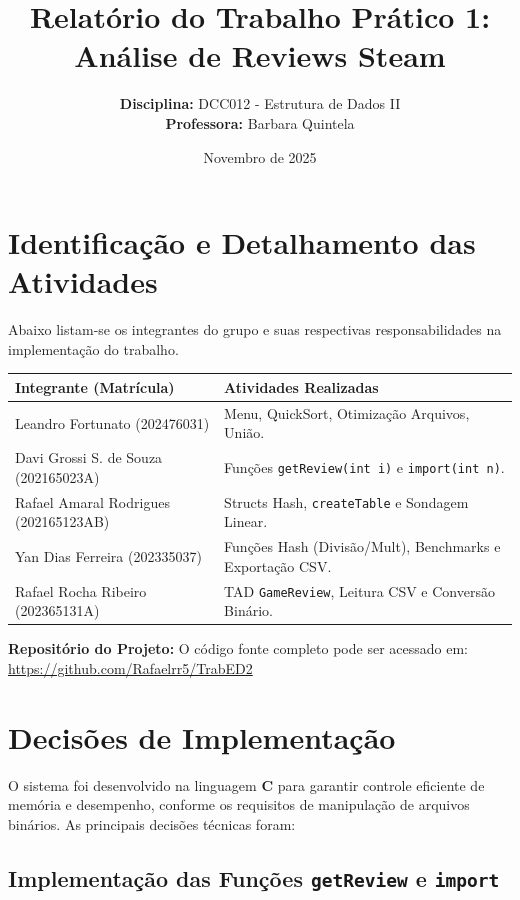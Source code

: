 \documentclass[11pt, a4paper]{article}
\title{\vspace{-2cm} \textbf{Relatório do Trabalho Prático 1: Análise de Reviews Steam}}
\author{
    \textbf{Disciplina:} DCC012 - Estrutura de Dados II \\
    \textbf{Professora:} Barbara Quintela
}
\date{Novembro de 2025}
\begin{document}
\maketitle
\thispagestyle{empty} %

\section{Identificação e Detalhamento das Atividades}

Abaixo listam-se os integrantes do grupo e suas respectivas responsabilidades na implementação do trabalho.

\begin{table}[h]
    \centering
    \begin{tabular}{@{}ll@{}}
        \toprule
        \textbf{Integrante (Matrícula)} & \textbf{Atividades Realizadas} \\ \midrule
        Leandro Fortunato (202476031) & Menu, QuickSort, Otimização Arquivos, União. \\ \midrule
        Davi Grossi S. de Souza (202165023A) & Funções \texttt{getReview(int i)} e \texttt{import(int n)}. \\ \midrule
        Rafael Amaral Rodrigues (202165123AB) & Structs Hash, \texttt{createTable} e Sondagem Linear. \\ \midrule
        Yan Dias Ferreira (202335037) & Funções Hash (Divisão/Mult), Benchmarks e Exportação CSV. \\ \midrule
        Rafael Rocha Ribeiro (202365131A) & TAD \texttt{GameReview}, Leitura CSV e Conversão Binário. \\ \bottomrule
    \end{tabular}
\end{table}

\noindent \textbf{Repositório do Projeto:} O código fonte completo pode ser acessado em: \\
\url{https://github.com/Rafaelrr5/TrabED2}

\section{Decisões de Implementação}

O sistema foi desenvolvido na linguagem \textbf{C} para garantir controle eficiente de memória e desempenho, conforme os requisitos de manipulação de arquivos binários. As principais decisões técnicas foram:

\subsection{Implementação das Funções \texttt{getReview} e \texttt{import}}
\end{document}
